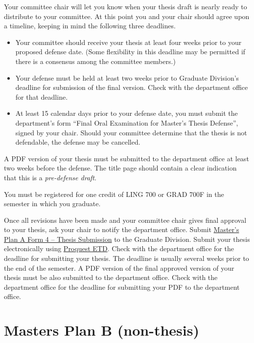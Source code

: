 \documentclass[
]{book}
\providecommand{\tightlist}{%
  \setlength{\itemsep}{0pt}\setlength{\parskip}{0pt}}
\begin{document}
Your committee chair will let you know when your thesis draft is nearly ready to distribute to your committee. At this point you and your chair should agree upon a timeline, keeping in mind the following three deadlines.

\begin{itemize}
\tightlist
\item
  Your committee should receive your thesis at least four weeks prior to your proposed defense date. (Some flexibility in this deadline may be permitted if there is a consensus among the committee members.)
\item
  Your defense must be held at least two weeks prior to Graduate Division's deadline for submission of the final version. Check with the department office for that deadline.
\item
  At least 15 calendar days prior to your defense date, you must submit the department's form ``Final Oral Examination for Master's Thesis Defense'', signed by your chair. Should your committee determine that the thesis is not defendable, the defense may be cancelled.
\end{itemize}

A PDF version of your thesis must be submitted to the department office at least two weeks before the defense. The title page should contain a clear indication that this is a \emph{pre-defense draft}.

You must be registered for one credit of LING 700 or GRAD 700F in the semester in which you graduate.

Once all revisions have been made and your committee chair gives final approval to your thesis, ask your chair to notify the department office. Submit \href{https://manoa.hawaii.edu/graduate/forms/}{Master's Plan A Form 4 -- Thesis Submission} to the Graduate Division. Submit your thesis electronically using \href{https://manoa.hawaii.edu/graduate/proquest-etd-submission-publication/}{Proquest ETD}. Check with the department office for the deadline for submitting your thesis. The deadline is usually several weeks prior to the end of the semester. A PDF version of the final approved version of your thesis must be also submitted to the department office. Check with the department office for the deadline for submitting your PDF to the department office.

\hypertarget{masters-plan-b-non-thesis}{%
\chapter{Masters Plan B (non-thesis)}\label{masters-plan-b-non-thesis}}
\end{document}
